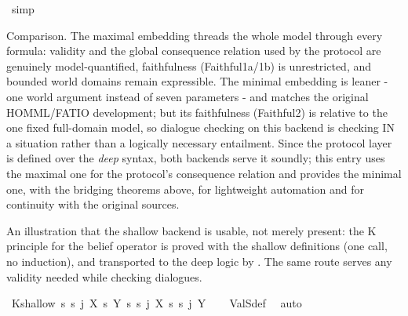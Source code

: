 \begin{isabellebody}
\ simp%
\endisatagproof
{\isafoldproof}%
%
\isadelimproof
%
\endisadelimproof
%
\begin{isamarkuptext}%
Comparison. The maximal embedding threads the whole model through every
formula: validity and the global consequence relation used by the protocol are
genuinely model-quantified, faithfulness (Faithful1a/1b) is unrestricted, and
bounded world domains remain expressible. The minimal embedding is leaner - one
world argument instead of seven parameters - and matches the original
HOMML/FATIO development; but its faithfulness (Faithful2) is relative to the one
fixed full-domain model, so dialogue checking on this backend is checking IN a
situation rather than a logically necessary entailment. Since the protocol layer
is defined over the \emph{deep} syntax, both backends serve it soundly; this entry uses
the maximal one for the protocol's consequence relation and provides the minimal
one, with the bridging theorems above, for lightweight automation and for
continuity with the original sources.%
\end{isamarkuptext}\isamarkuptrue%
%
\isadelimdocument
%
\endisadelimdocument
%
\isatagdocument
%
\isamarkuptrue%
%
\endisatagdocument
{\isafolddocument}%
%
\isadelimdocument
%
\endisadelimdocument
%
\begin{isamarkuptext}%
An illustration that the shallow backend is usable, not merely present: the
K principle for the belief operator is proved with the shallow definitions (one
call, no induction), and transported to the deep logic by . The same
route serves any validity needed while checking dialogues.%
\end{isamarkuptext}\isamarkuptrue%
\isamarkupfalse%
\ K{\isacharunderscore}{\kern0pt}shallow{\isacharcolon}{\kern0pt}\ {\isachardoublequoteopen}{\isasymTurnstile}\isactrlsup s\ {\isacharparenleft}{\kern0pt}{\isasymB}\isactrlsup s\ j\ {\isacharparenleft}{\kern0pt}X\ {\isasymsupset}\isactrlsup s\ Y{\isacharparenright}{\kern0pt}\ {\isasymsupset}\isactrlsup s\ {\isacharparenleft}{\kern0pt}{\isasymB}\isactrlsup s\ j\ X\ {\isasymsupset}\isactrlsup s\ {\isasymB}\isactrlsup s\ j\ Y{\isacharparenright}{\kern0pt}{\isacharparenright}{\kern0pt}{\isachardoublequoteclose}\isanewline
%
\isadelimproof
\ \ %
\endisadelimproof
%
\isatagproof
{}\isamarkupfalse%
\ ValS{\isacharunderscore}{\kern0pt}def\ \isamarkupfalse%
\ auto%
\endisatagproof
{\isafoldproof}%
%
\isadelimproof
\isanewline

\end{isabellebody}
